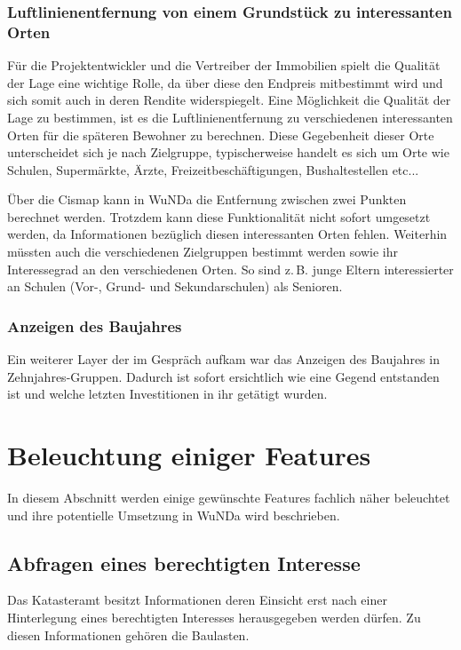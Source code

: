 \subsubsection{Luftlinienentfernung von einem Grundstück zu interessanten Orten}
Für die Projektentwickler und die Vertreiber der Immobilien spielt die Qualität der Lage eine wichtige Rolle, da über diese den Endpreis mitbestimmt wird und sich somit auch in deren Rendite widerspiegelt.
Eine Möglichkeit die Qualität der Lage zu bestimmen, ist es die Luftlinienentfernung zu verschiedenen interessanten Orten für die späteren Bewohner zu berechnen.
Diese Gegebenheit dieser Orte unterscheidet sich je nach Zielgruppe, typischerweise handelt es sich um Orte wie Schulen, Supermärkte, Ärzte, Freizeitbeschäftigungen, Bushaltestellen etc...

Über die Cismap kann in \ac{WuNDa} die Entfernung zwischen zwei Punkten berechnet werden.
Trotzdem kann diese Funktionalität nicht sofort umgesetzt werden, da Informationen bezüglich diesen interessanten Orten fehlen.
Weiterhin müssten auch die verschiedenen Zielgruppen bestimmt werden sowie ihr Interessegrad an den verschiedenen Orten.
So sind z.\,B. junge Eltern interessierter an Schulen (Vor-, Grund- und Sekundarschulen) als Senioren.

\subsubsection{Anzeigen des Baujahres}
Ein weiterer Layer der im Gespräch aufkam war das Anzeigen des Baujahres in Zehnjahres-Gruppen.
Dadurch ist sofort ersichtlich wie eine Gegend entstanden ist und welche letzten Investitionen in ihr getätigt wurden.


\section{Beleuchtung einiger Features}

In diesem Abschnitt werden einige gewünschte Features fachlich näher beleuchtet und ihre potentielle Umsetzung in \ac{WuNDa} wird beschrieben.

\subsection{Abfragen eines berechtigten Interesse}
\label{subsec:berechtigtes-interesse}
Das Katasteramt besitzt Informationen deren Einsicht erst nach einer Hinterlegung eines berechtigten Interesses herausgegeben werden dürfen.
Zu diesen Informationen gehören die Baulasten.

